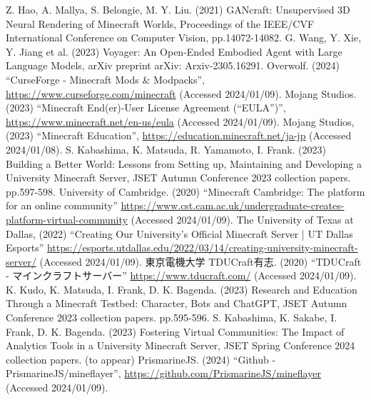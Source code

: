 \begin{thebibliography}{99}
	Z. Hao, A. Mallya, S. Belongie, M. Y. Liu. (2021) 
    GANcraft: Unsupervised 3D Neural Rendering of Minecraft Worlds, 
    Proceedings of the IEEE/CVF International Conference on Computer Vision, pp.14072-14082.
    G. Wang, Y. Xie, Y. Jiang et al. (2023)
    Voyager: An Open-Ended Embodied Agent with Large Language Models, 
    arXiv preprint arXiv: Arxiv-2305.16291.
    Overwolf. (2024) 
    ``CurseForge - Minecraft Mods \& Modpacks'',
    \url{https://www.curseforge.com/minecraft} (Accessed 2024/01/09).
    Mojang Studios. (2023)
    ``Minecraft End(er)-User License Agreement (``EULA'')'',
    \url{https://www.minecraft.net/en-us/eula} (Accessed 2024/01/09).
    Mojang Studios, (2023)
    ``Minecraft Education'', 
    \url{https://education.minecraft.net/ja-jp} (Accessed 2024/01/08).
    S. Kabashima, K. Matsuda, R. Yamamoto, I. Frank. (2023) 
    Building a Better World: Lessons from Setting up, Maintaining and Developing a University Minecraft Server, 
    JSET Autumn Conference 2023 collection papers. pp.597-598.
    University of Cambridge. (2020)
    ``Minecraft Cambridge: The platform for an online community''
    \url{https://www.cst.cam.ac.uk/undergraduate-creates-platform-virtual-community} (Accessed 2024/01/09).
    The University of Texas at Dallas, (2022)
    ``Creating Our University’s Official Minecraft Server | UT Dallas Esports''
    \url{https://esports.utdallas.edu/2022/03/14/creating-university-minecraft-server/} (Accessed 2024/01/09).
    東京電機大学 TDUCraft有志. (2020)
    ``TDUCraft - マインクラフトサーバー''
    \url{https://www.tducraft.com/} (Accessed 2024/01/09).
    K. Kudo, K. Matsuda, I. Frank, D. K. Bagenda. (2023)
    Research and Education Through a Minecraft Testbed: Character, Bots and ChatGPT,
    JSET Autumn Conference 2023 collection papers. pp.595-596.
    S. Kabashima, K. Sakabe, I. Frank, D. K. Bagenda. (2023) 
    Fostering Virtual Communities: The Impact of Analytics Tools in a University Minecraft Server, 
    JSET Spring Conference 2024 collection papers. (to appear)
    PrismarineJS. (2024) 
    ``Github - PrismarineJS/mineflayer'', 
    \url{https://github.com/PrismarineJS/mineflayer} (Accessed 2024/01/09).

\end{thebibliography}
